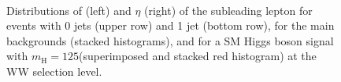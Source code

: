 \begin{figure}
\centering
{}
\\
\caption{Distributions of \pt (left) and $\eta$ (right) of the subleading lepton for events with 0 jets (upper row) and 1 jet (bottom row), for the main backgrounds (stacked histograms), and for a SM Higgs boson signal with $m_\mathrm{H}=125$\GeV (superimposed and stacked red histogram) at the WW selection level.}\label{fig:distr2}
\end{figure}

